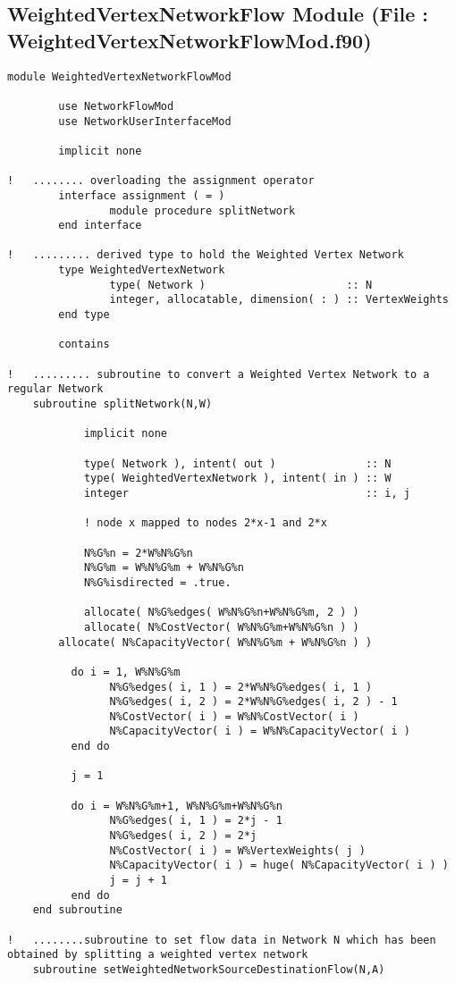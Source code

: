 \documentclass[10pt,a4paper,margin = 1.25cm]{article}
\begin{document}
\subsection*{WeightedVertexNetworkFlow Module (File : WeightedVertexNetworkFlowMod.f90)}
\begin{lstlisting}
module WeightedVertexNetworkFlowMod

		use NetworkFlowMod
		use NetworkUserInterfaceMod
		
		implicit none
		
!   ........ overloading the assignment operator		
		interface assignment ( = )
				module procedure splitNetwork
		end interface
		
!   ......... derived type to hold the Weighted Vertex Network		
		type WeightedVertexNetwork
				type( Network )                      :: N
				integer, allocatable, dimension( : ) :: VertexWeights
		end type
		
		contains
    
!   ......... subroutine to convert a Weighted Vertex Network to a regular Network    
    subroutine splitNetwork(N,W)
    
    		implicit none
    		
    		type( Network ), intent( out )              :: N
    		type( WeightedVertexNetwork ), intent( in ) :: W
    		integer                                     :: i, j
    		
    		! node x mapped to nodes 2*x-1 and 2*x
    		
    		N%G%n = 2*W%N%G%n
    		N%G%m = W%N%G%m + W%N%G%n
    		N%G%isdirected = .true.
    		
    		allocate( N%G%edges( W%N%G%n+W%N%G%m, 2 ) )
    		allocate( N%CostVector( W%N%G%m+W%N%G%n ) )
        allocate( N%CapacityVector( W%N%G%m + W%N%G%n ) )
        
    	  do i = 1, W%N%G%m
    	  		N%G%edges( i, 1 ) = 2*W%N%G%edges( i, 1 )
    	  		N%G%edges( i, 2 ) = 2*W%N%G%edges( i, 2 ) - 1
    	  		N%CostVector( i ) = W%N%CostVector( i )
    	  		N%CapacityVector( i ) = W%N%CapacityVector( i )
    	  end do
    	  
    	  j = 1
    	  
    	  do i = W%N%G%m+1, W%N%G%m+W%N%G%n
    	  		N%G%edges( i, 1 ) = 2*j - 1
    	  		N%G%edges( i, 2 ) = 2*j
    	  		N%CostVector( i ) = W%VertexWeights( j )
    	  		N%CapacityVector( i ) = huge( N%CapacityVector( i ) )
    	  		j = j + 1
    	  end do
    end subroutine
		
!   ........subroutine to set flow data in Network N which has been obtained by splitting a weighted vertex network		
    subroutine setWeightedNetworkSourceDestinationFlow(N,A)
        

\end{lstlisting}
\end{document}
